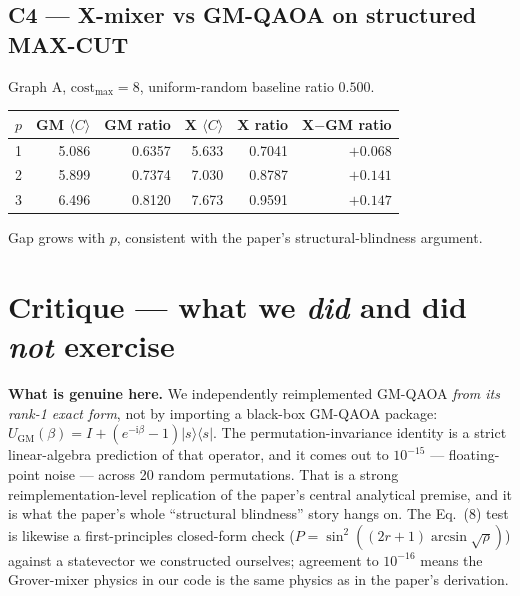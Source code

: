 \documentclass[11pt]{article}
\begin{document}
\subsection{C4 --- X-mixer vs GM-QAOA on structured MAX-CUT}
Graph A, $\text{cost}_{\max}=8$, uniform-random baseline ratio $0.500$.
\begin{center}
\begin{tabular}{crrrrr}
\toprule
$p$ & GM $\langle C\rangle$ & GM ratio & X $\langle C\rangle$ & X ratio & X$-$GM ratio \\
\midrule
1 & 5.086 & 0.6357 & 5.633 & 0.7041 & $+0.068$ \\
2 & 5.899 & 0.7374 & 7.030 & 0.8787 & $+0.141$ \\
3 & 6.496 & 0.8120 & 7.673 & 0.9591 & $+0.147$ \\
\bottomrule
\end{tabular}
\end{center}
Gap grows with $p$, consistent with the paper's structural-blindness argument.

\section{Critique --- what we \emph{did} and did \emph{not} exercise}
\textbf{What is genuine here.} We independently reimplemented GM-QAOA \emph{from its rank-1 exact form}, not by importing a black-box GM-QAOA package: $U_{\mathrm{GM}}(\beta) = I + (e^{-\mathrm{i}\beta}-1)|s\rangle\!\langle s|$. The permutation-invariance identity is a strict linear-algebra prediction of that operator, and it comes out to $10^{-15}$ --- floating-point noise --- across 20 random permutations. That is a strong reimplementation-level replication of the paper's central analytical premise, and it is what the paper's whole ``structural blindness'' story hangs on.
The Eq.~(8) test is likewise a first-principles closed-form check ($P = \sin^2((2r+1)\arcsin\sqrt{\rho})$) against a statevector we constructed ourselves; agreement to $10^{-16}$ means the Grover-mixer physics in our code is the same physics as in the paper's derivation.
\end{document}
